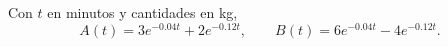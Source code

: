 Con \(t\) en minutos y cantidades en kg,
\[A(t)=3e^{-0.04t}+2e^{-0.12t},\qquad B(t)=6e^{-0.04t}-4e^{-0.12t}.\]
